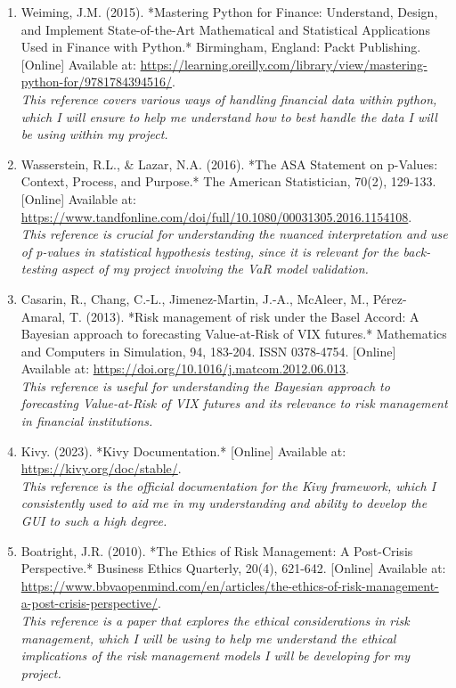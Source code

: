 \documentclass{article}
\begin{document}
\begin{small}
\begin{enumerate}
  \item\label{ref10} Weiming, J.M. (2015). *Mastering Python for Finance: Understand, Design, and Implement State-of-the-Art Mathematical and Statistical Applications Used in Finance with Python.* Birmingham, England: Packt Publishing. [Online] Available at: \url{https://learning.oreilly.com/library/view/mastering-python-for/9781784394516/}.
  \\\textit{This reference covers various ways of handling financial data within python, which I will ensure to help me understand how to best handle the data I will be using within my project.}

  \item\label{ref11} Wasserstein, R.L., \& Lazar, N.A. (2016). *The ASA Statement on p-Values: Context, Process, and Purpose.* The American Statistician, 70(2), 129-133. [Online] Available at: \url{https://www.tandfonline.com/doi/full/10.1080/00031305.2016.1154108}.
  \\\textit{This reference is crucial for understanding the nuanced interpretation and use of p-values in statistical hypothesis testing, since it is  relevant for the back-testing aspect of my project involving the VaR model validation.}

  \item\label{ref12} Casarin, R., Chang, C.-L., Jimenez-Martin, J.-A., McAleer, M., Pérez-Amaral, T. (2013). *Risk management of risk under the Basel Accord: A Bayesian approach to forecasting Value-at-Risk of VIX futures.* Mathematics and Computers in Simulation, 94, 183-204. ISSN 0378-4754. [Online] Available at: \url{https://doi.org/10.1016/j.matcom.2012.06.013}.
  \\\textit{This reference is useful for understanding the Bayesian approach to forecasting Value-at-Risk of VIX futures and its relevance to risk management in financial institutions.}




  \item\label{ref13} Kivy. (2023). *Kivy Documentation.* [Online] Available at: \url{https://kivy.org/doc/stable/}.
  \\\textit{This reference is the official documentation for the Kivy framework, which I consistently used to aid me in my understanding and ability to develop the GUI to such a high degree.}
  
  \item\label{ref14} Boatright, J.R. (2010). *The Ethics of Risk Management: A Post-Crisis Perspective.* Business Ethics Quarterly, 20(4), 621-642. [Online] Available at: \url{https://www.bbvaopenmind.com/en/articles/the-ethics-of-risk-management-a-post-crisis-perspective/}.
  \\\textit{This reference is a paper that explores the ethical considerations in risk management, which I will be using to help me understand the ethical implications of the risk management models I will be developing for my project.}


\end{enumerate}
\end{small}
\end{document}
